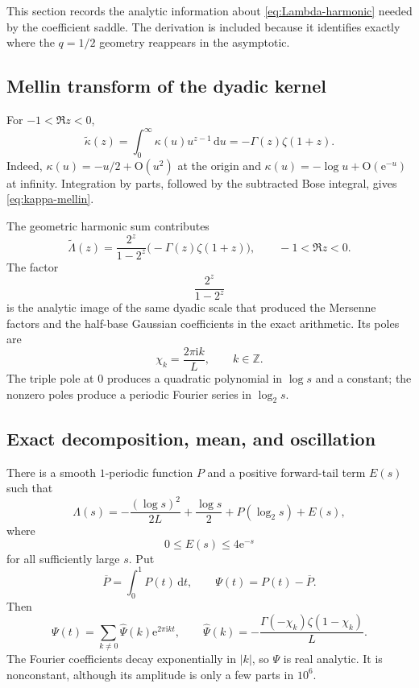\documentclass[11pt,oneside]{article}
\theoremstyle{definition}
\theoremstyle{remark}
\newcommand{\Z}{\mathbb Z}
\newcommand{\e}{\mathrm e}
\newcommand{\ii}{\mathrm i}
\newcommand{\dd}{\,\mathrm d}
\newcommand{\bigO}{\mathrm O}
\begin{document}
This section records the analytic information about \eqref{eq:Lambda-harmonic} needed by the coefficient saddle.  The derivation is included because it identifies exactly where the $q=1/2$ geometry reappears in the asymptotic.

\subsection{Mellin transform of the dyadic kernel}

For $-1<\Re z<0$,
\begin{equation}
 \widetilde\kappa(z)=\int_0^\infty\kappa(u)u^{z-1}\dd u
 =-\Gamma(z)\zeta(1+z).
\label{eq:kappa-mellin}
\end{equation}
Indeed, $\kappa(u)=-u/2+\bigO(u^2)$ at the origin and
$\kappa(u)=-\log u+\bigO(\e^{-u})$ at infinity.  Integration by parts, followed by the subtracted Bose integral, gives \eqref{eq:kappa-mellin}.

The geometric harmonic sum contributes
\begin{equation}
 \widetilde\Lambda(z)
 =\frac{2^z}{1-2^z}\bigl(-\Gamma(z)\zeta(1+z)\bigr),
 \qquad -1<\Re z<0.
\label{eq:Lambda-mellin}
\end{equation}
The factor
\begin{equation}
 \frac{2^z}{1-2^z}
\label{eq:geometric-mellin-factor}
\end{equation}
is the analytic image of the same dyadic scale that produced the Mersenne factors and the half-base Gaussian coefficients in the exact arithmetic.  Its poles are
\begin{equation}
 \chi_k=\frac{2\pi\ii k}{L},
 \qquad k\in\Z.
\label{eq:chi-k}
\end{equation}
The triple pole at $0$ produces a quadratic polynomial in $\log s$ and a constant; the nonzero poles produce a periodic Fourier series in $\log_2s$.

\subsection{Exact decomposition, mean, and oscillation}

There is a smooth $1$-periodic function $P$ and a positive forward-tail term $E(s)$ such that
\begin{equation}
 \Lambda(s)=
 -\frac{(\log s)^2}{2L}+\frac{\log s}{2}
 +P(\log_2s)+E(s),
\label{eq:Lambda-periodic}
\end{equation}
where
\begin{equation}
 0\le E(s)\le4\e^{-s}
\label{eq:E-bound}
\end{equation}
for all sufficiently large $s$.  Put
\begin{equation}
 \overline P=\int_0^1P(t)\dd t,
 \qquad
 \Psi(t)=P(t)-\overline P.
\label{eq:Psi-def}
\end{equation}
Then
\begin{equation}
 \Psi(t)=\sum_{k\ne0}\widehat\Psi(k)\e^{2\pi\ii kt},
 \qquad
 \widehat\Psi(k)=
 -\frac{\Gamma(-\chi_k)\zeta(1-\chi_k)}L.
\label{eq:Psi-Fourier}
\end{equation}
The Fourier coefficients decay exponentially in $|k|$, so $\Psi$ is real analytic.  It is nonconstant, although its amplitude is only a few parts in $10^6$.
\end{document}

